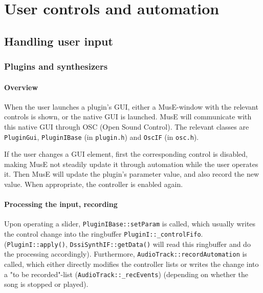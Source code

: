\documentclass[a4paper]{report}
\begin{document}
\section{User controls and automation}
\subsection{Handling user input}
\subsubsection{Plugins and synthesizers}
\paragraph{Overview}
When the user launches a plugin's GUI, either a MusE-window with
the relevant controls is shown, or the native GUI is launched. MusE
will communicate with this native GUI through OSC (Open Sound Control).
The relevant classes are \texttt{PluginGui}, \texttt{PluginIBase}
(in \texttt{plugin.h}) and \texttt{OscIF} (in \texttt{osc.h}).

If the user changes a GUI element, first the corresponding control is
disabled, making MusE not steadily update it through automation
while the user operates it. Then MusE will update the plugin's parameter
value, and also record the new value. When appropriate, the controller
is enabled again.

\paragraph{Processing the input, recording}
Upon operating a slider, \texttt{PluginIBase::setParam} is called,
which usually writes the control change into the ringbuffer
\texttt{PluginI::\_controlFifo}. (\texttt{PluginI::apply()},
\texttt{DssiSynthIF::getData()} will read this ringbuffer and
do the processing accordingly). Furthermore, \texttt{AudioTrack::recordAutomation}
is called, which either directly modifies the controller lists or writes
the change into a "to be recorded"-list (\texttt{AudioTrack::\_recEvents})
(depending on whether the song is stopped or played).
\end{document}
